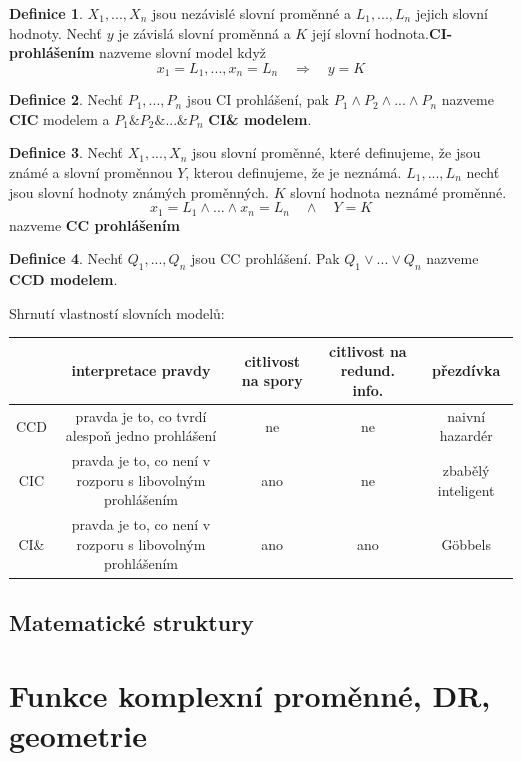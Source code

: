 \documentclass[a4]{report}
\theoremstyle{definition}
\newtheorem{definition}{Definice}[section]
\begin{document}
\begin{definition}
$X_1,...,X_n$ jsou nezávislé slovní proměnné a $L_1,...,L_n$ jejich slovní hodnoty. Nechť $y$ je závislá slovní proměnná a $K$ její slovní hodnota.\textbf{CI-prohlášením} nazveme slovní model když $$x_1=L_1,...,x_n=L_n \quad \Longrightarrow \quad y=K$$
\end{definition}

\begin{definition}
Nechť $P_1,...,P_n$ jsou CI prohlášení, pak $P_1\wedge P_2\wedge...\wedge P_n$ nazveme \textbf{CIC} modelem a $P_1 \& P_2 \&... \& P_n$ \textbf{CI\& modelem}.
\end{definition}

\begin{definition}
Nechť $X_1,...,X_n$ jsou slovní proměnné, které definujeme, že jsou známé a slovní proměnnou $Y$, kterou definujeme, že je neznámá. $L_1,...,L_n$ nechť jsou slovní hodnoty známých proměnných. $K$ slovní hodnota neznámé proměnné. $$x_1=L_1\wedge...\wedge x_n=L_n \quad \wedge \quad Y=K$$ nazveme \textbf{CC prohlášením}
\end{definition}

\begin{definition}
Nechť $Q_1,...,Q_n$ jsou CC prohlášení. Pak $Q_1 \vee...\vee Q_n$ nazveme \textbf{CCD modelem}.
\end{definition}

Shrnutí vlastností slovních modelů:
\begin{center}
 \begin{tabular}{|| c ||c c c c||} 
 \hline
  & interpretace pravdy & citlivost na spory & citlivost na redund. info. & přezdívka \\ [0.5ex] 
 \hline\hline
 CCD & pravda je to, co tvrdí alespoň jedno prohlášení & ne & ne & naivní hazardér \\ 
 \hline
 CIC & pravda je to, co není v rozporu s libovolným prohlášením & ano & ne & zbabělý inteligent \\
 \hline
 CI\& & pravda je to, co není v rozporu s libovolným prohlášením & ano & ano & Göbbels \\ [1ex] 
 \hline
 \end{tabular}
\end{center}

\section{Matematické struktury}

\chapter{Funkce komplexní proměnné, DR, geometrie}
\end{document}
